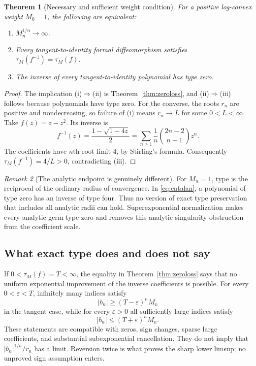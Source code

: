 \documentclass[11pt,a4paper]{article}
\numberwithin{equation}{section}
\newtheorem{theorem}{Theorem}[section]
\theoremstyle{definition}
\theoremstyle{remark}
\newtheorem{remark}[theorem]{Remark}
\newcommand{\typ}{\tau_M}
\begin{document}
\begin{theorem}[Necessary and sufficient weight condition]
\label{thm:iff}
For a positive log-convex weight $M_0=1$, the following are equivalent:
\begin{enumerate}[label=(\roman*)]
\item $M_n^{1/n}\to\infty$.
\item Every tangent-to-identity formal diffeomorphism satisfies
$\typ(f^{-1})=\typ(f)$.
\item The inverse of every tangent-to-identity polynomial has type zero.
\end{enumerate}
\end{theorem}
\begin{proof}
The implication (i)$\Rightarrow$(ii) is Theorem~\ref{thm:zeroloss},
and (ii)$\Rightarrow$(iii) follows because polynomials have type zero.
For the converse, the roots $r_n$ are positive and nondecreasing, so
failure of (i) means $r_n\to L$ for some $0<L<\infty$. Take
$f(z)=z-z^2$. Its inverse is
\begin{equation}
 f^{-1}(z)=\frac{1-\sqrt{1-4z}}2
 =\sum_{n\ge1}\frac1n\binom{2n-2}{n-1}z^n.
 \label{eq:catalan}
\end{equation}
The coefficients have $n$th-root limit $4$, by Stirling's formula.
Consequently $\typ(f^{-1})=4/L>0$, contradicting (iii).
\end{proof}

\begin{remark}[The analytic endpoint is genuinely different]
For $M_n=1$, type is the reciprocal of the ordinary radius of
convergence. In \eqref{eq:catalan}, a polynomial of type zero has an
inverse of type four. Thus no version of exact type preservation that
includes all analytic radii can hold. Superexponential normalization
makes every analytic germ type zero and removes this analytic
singularity obstruction from the coefficient scale.
\end{remark}

\subsection{What exact type does and does not say}

If $0<\typ(f)=T<\infty$, the equality in
Theorem~\ref{thm:zeroloss} says that no uniform exponential improvement
of the inverse coefficients is possible. For every $0<\varepsilon<T$,
infinitely many indices satisfy
\[
 |b_n|\ge (T-\varepsilon)^nM_n
\]
in the tangent case, while for every $\varepsilon>0$ all sufficiently
large indices satisfy
\[
 |b_n|\le (T+\varepsilon)^nM_n.
\]
These statements are compatible with zeros, sign changes, sparse large
coefficients, and substantial subexponential cancellation. They do not
imply that $|b_n|^{1/n}/r_n$ has a limit. Reversion twice is what proves
the sharp lower limsup; no unproved sign assumption enters.
\end{document}
